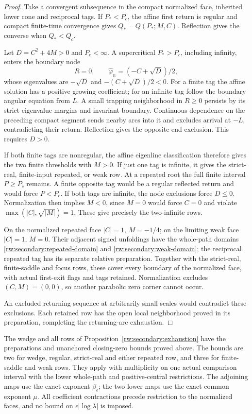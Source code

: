 \begin{proof}
Take a convergent subsequence in the compact normalized face,
inherited lower cone and reciprocal tags. If $P_*<P_c$, the affine first return
is regular and compact finite-time convergence gives
$Q_*=Q(P_*;M,C)$. Reflection gives the converse when $Q_*<Q_c$.

Let $D=C^2+4M>0$ and $P_c<\infty$. A supercritical
$P_*>P_c$, including infinity, enters the boundary node
\[
 R=0,\qquad \hat\varphi_n=(-C+\sqrt D)/2,
\]
whose eigenvalues are $-\sqrt D$ and $-(C+\sqrt D)/2<0$.
For a finite tag the affine solution has a positive growing
coefficient; for an infinite tag follow the boundary angular equation
from $L$. A small trapping neighborhood in $R\ge0$ persists by its
strict eigenvalue margins and invariant boundary. Continuous
dependence on the preceding compact segment sends nearby arcs into
it and excludes arrival at $-L$, contradicting their return.
Reflection gives the opposite-end exclusion. This requires $D>0$.

If both finite tags are nonregular, the affine eigenline classification
therefore gives the two finite thresholds with $M>0$.
If just one tag is infinite, it gives the strict-real, finite-input
repeated, or weak row. At a repeated root the full finite interval
$P\ge P_c$ remains. A finite opposite tag would be a regular
reflected return and would force $P<P_c$.
If both tags are infinite, the node exclusions force $D\le0$.
Normalization then implies $M<0$, since $M=0$ would force
$C=0$ and violate $\max(|C|,\sqrt{|M|})=1$.
These give precisely the two-infinite rows.

On the normalized repeated face $|C|=1$, $M=-1/4$;
on the limiting weak face $|C|=1$, $M=0$.
Their adjacent signed unfoldings have the whole-path domains
\eqref{rw:secondary:repeated-domain} and
\eqref{rw:secondary:weak-domain}; the reciprocal repeated tag has
its separate relative preparation. Together with the strict-real,
finite-saddle and focus rows, these cover every boundary of the
normalized face, with actual first-exit flags and tags retained.
Normalization excludes $(C,M)=(0,0)$, so another parabolic zero
corner cannot occur.

An excluded returning sequence at arbitrarily small scales would
contradict these exclusions. Each retained row has the open local
neighborhood proved in its preparation, completing the returning-arc
exhaustion.
\end{proof}

\begin{theorem}\label{rw:secondary-local}
The wedge and all rows of Proposition~\ref{rw:secondary:exhaustion}
have the preparations and unanchored closing-zero bounds proved above.
The bounds are two for wedge, regular, strict-real and either repeated
row, and three for finite-saddle and weak rows.
They apply with multiplicity on one actual comparison interval with
the lower whole-path and positive-central restrictions.
The adjoining maps use the exact exponent $\beta_\epsilon$;
the two lower maps use the exact common exponent $\mu$.
All coefficient contractions precede restriction to the normalized
faces, and no bound on $\epsilon|\log\lambda|$ is imposed.
\end{theorem}

